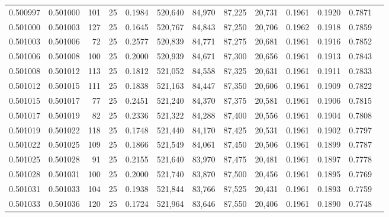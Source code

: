 \begin{tabular}{rrrrrrrrrrrrr}
0.500997 & 0.501000 & 101 &  25 &                                     0.1984 & 520,640 &  84,970 &  87,225 &  20,731 & 0.1961 & 0.1920 & 0.7871 \\
0.501000 & 0.501003 & 127 &  25 &                                     0.1645 & 520,767 &  84,843 &  87,250 &  20,706 & 0.1962 & 0.1918 & 0.7859 \\
0.501003 & 0.501006 &  72 &  25 &                                     0.2577 & 520,839 &  84,771 &  87,275 &  20,681 & 0.1961 & 0.1916 & 0.7852 \\
0.501006 & 0.501008 & 100 &  25 &                                     0.2000 & 520,939 &  84,671 &  87,300 &  20,656 & 0.1961 & 0.1913 & 0.7843 \\
0.501008 & 0.501012 & 113 &  25 &                                     0.1812 & 521,052 &  84,558 &  87,325 &  20,631 & 0.1961 & 0.1911 & 0.7833 \\
0.501012 & 0.501015 & 111 &  25 &                                     0.1838 & 521,163 &  84,447 &  87,350 &  20,606 & 0.1961 & 0.1909 & 0.7822 \\
0.501015 & 0.501017 &  77 &  25 &                                     0.2451 & 521,240 &  84,370 &  87,375 &  20,581 & 0.1961 & 0.1906 & 0.7815 \\
0.501017 & 0.501019 &  82 &  25 &                                     0.2336 & 521,322 &  84,288 &  87,400 &  20,556 & 0.1961 & 0.1904 & 0.7808 \\
0.501019 & 0.501022 & 118 &  25 &                                     0.1748 & 521,440 &  84,170 &  87,425 &  20,531 & 0.1961 & 0.1902 & 0.7797 \\
0.501022 & 0.501025 & 109 &  25 &                                     0.1866 & 521,549 &  84,061 &  87,450 &  20,506 & 0.1961 & 0.1899 & 0.7787 \\
0.501025 & 0.501028 &  91 &  25 &                                     0.2155 & 521,640 &  83,970 &  87,475 &  20,481 & 0.1961 & 0.1897 & 0.7778 \\
0.501028 & 0.501031 & 100 &  25 &                                     0.2000 & 521,740 &  83,870 &  87,500 &  20,456 & 0.1961 & 0.1895 & 0.7769 \\
0.501031 & 0.501033 & 104 &  25 &                                     0.1938 & 521,844 &  83,766 &  87,525 &  20,431 & 0.1961 & 0.1893 & 0.7759 \\
0.501033 & 0.501036 & 120 &  25 &                                     0.1724 & 521,964 &  83,646 &  87,550 &  20,406 & 0.1961 & 0.1890 & 0.7748 \\

\end{tabular}
